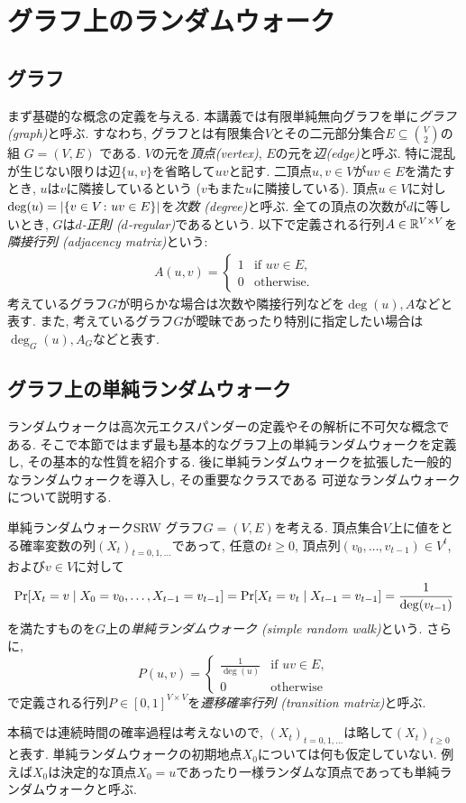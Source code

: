 \section{グラフ上のランダムウォーク}
\subsection{グラフ}
まず基礎的な概念の定義を与える.
本講義では有限単純無向グラフを単に\emph{グラフ (graph)}と呼ぶ.
すなわち, グラフとは有限集合$V$とその二元部分集合$E\subseteq \binom{V}{2}$の組 $G = (V, E)$ である.
$V$の元を\emph{頂点(vertex)}, $E$の元を\emph{辺(edge)}と呼ぶ.
特に混乱が生じない限りは辺$\{u,v\}$を省略して$uv$と記す.
二頂点$u,v\in V$が$uv\in E$を満たすとき, $u$は$v$に隣接しているという ($v$もまた$u$に隣接している).
頂点$u\in V$に対し$\deg(u) = \lvert\lbrace v \in V \colon uv\in E\rbrace\rvert$を\emph{次数 (degree)}と呼ぶ.
全ての頂点の次数が$d$に等しいとき, $G$は\emph{$d$-正則 ($d$-regular)}であるという.
以下で定義される行列$A \in \mathbb{R}^{V\times V}$を\emph{隣接行列 (adjacency matrix)}という:
\begin{align*}
  A(u,v) = \begin{cases}
    1	& \text{if }uv\in E,\\
    0 & \text{otherwise}.
  \end{cases}
\end{align*}
考えているグラフ$G$が明らかな場合は次数や隣接行列などを$\deg(u),A$などと表す.
また, 考えているグラフ$G$が曖昧であったり特別に指定したい場合は$\deg_G(u),A_G$などと表す.

\subsection{グラフ上の単純ランダムウォーク}
ランダムウォークは高次元エクスパンダーの定義やその解析に不可欠な概念である.
そこで本節ではまず最も基本的なグラフ上の単純ランダムウォークを定義し, その基本的な性質を紹介する.
後に単純ランダムウォークを拡張した一般的なランダムウォークを導入し, その重要なクラスである
可逆なランダムウォークについて説明する.
%
\begin{definition}{単純ランダムウォーク}{SRW}
  グラフ$G=(V,E)$を考える.
  頂点集合$V$上に値をとる確率変数の列$(X_t)_{t=0,1,\dots}$であって,
  任意の$t\ge 0$, 頂点列$(v_0,\dots,v_{t-1})\in V^t$, および$v\in V$に対して
  \[
    \Pr\sbra*{ X_t = v \condition X_0=v_0,\dots,X_{t-1} = v_{t-1} } = \Pr\sbra*{ X_t = v_t \condition X_{t-1} = v_{t-1}} = \frac{1}{\deg(v_{t-1})}
  \]
  を満たすものを$G$上の\emph{単純ランダムウォーク (simple random walk)}という.
  さらに,
  \[
    P(u,v) = \begin{cases}
      \frac{1}{\deg(u)}	& \text{if }uv\in E,\\
      0 & \text{otherwise}
    \end{cases}
  \]
  で定義される行列$P \in [0,1]^{V\times V}$を\emph{遷移確率行列 (transition matrix)}と呼ぶ.
\end{definition}
本稿では連続時間の確率過程は考えないので, $(X_t)_{t=0,1,\dots}$は略して$(X_t)_{t\ge 0}$と表す.
単純ランダムウォークの初期地点$X_0$については何も仮定していない.
例えば$X_0$は決定的な頂点$X_0=u$であったり一様ランダムな頂点であっても単純ランダムウォークと呼ぶ.

